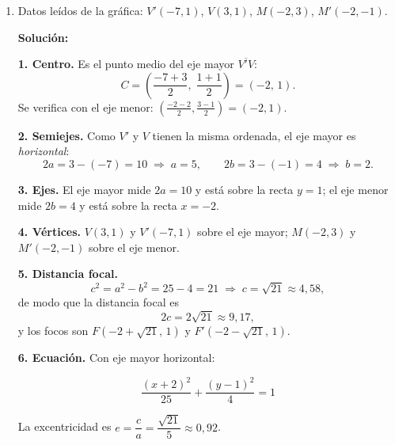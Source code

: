 \documentclass[12pt]{article}
\newcommand{\solucion}{%
    \vspace{0.8em}%
    \textbf{Solución:}%
    \vspace{0.8em}%
}
\begin{document}
\begin{enumerate}[label=\alph*.-]

    \item Datos leídos de la gráfica:
    $V'(-7,1)$, $V(3,1)$, $M(-2,3)$, $M'(-2,-1)$.

    \solucion

    \textbf{1. Centro.} Es el punto medio del eje mayor $\overline{V'V}$:
    \[
    C=\left(\frac{-7+3}{2},\;\frac{1+1}{2}\right)=(-2,\,1).
    \]
    Se verifica con el eje menor:
    $\left(\frac{-2-2}{2},\frac{3-1}{2}\right)=(-2,1)$.

    \textbf{2. Semiejes.} Como $V'$ y $V$ tienen la misma ordenada, el eje mayor
    es \emph{horizontal}:
    \[
    2a=3-(-7)=10\;\Rightarrow\;a=5,
    \qquad
    2b=3-(-1)=4\;\Rightarrow\;b=2 .
    \]

    \textbf{3. Ejes.} El eje mayor mide $2a=10$ y está sobre la recta $y=1$; el
    eje menor mide $2b=4$ y está sobre la recta $x=-2$.

    \textbf{4. Vértices.} $V(3,1)$ y $V'(-7,1)$ sobre el eje mayor;
    $M(-2,3)$ y $M'(-2,-1)$ sobre el eje menor.

    \textbf{5. Distancia focal.}
    \[
    c^{2}=a^{2}-b^{2}=25-4=21
    \;\Rightarrow\;
    c=\sqrt{21}\approx 4{,}58 ,
    \]
    de modo que la distancia focal es
    \[
    2c=2\sqrt{21}\approx 9{,}17,
    \]
    y los focos son $F(-2+\sqrt{21},\,1)$ y $F'(-2-\sqrt{21},\,1)$.

    \textbf{6. Ecuación.} Con eje mayor horizontal:

    \[
    \boxed{
    \frac{(x+2)^{2}}{25}+\frac{(y-1)^{2}}{4}=1
    }
    \]

    La excentricidad es $e=\dfrac{c}{a}=\dfrac{\sqrt{21}}{5}\approx 0{,}92$.


\end{enumerate}
\end{document}
